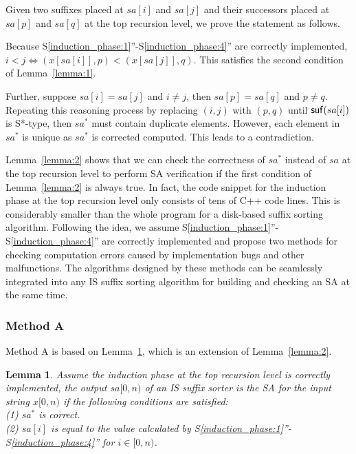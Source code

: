\documentclass[10pt,journal,compsoc]{IEEEtran}
\newtheorem{lemma}[theorem]{Lemma}
\begin{document}
\begin{IEEEproof} Given two suffixes placed at $sa[i]$ and $sa[j]$ and their successors placed at $sa[p]$ and $sa[q]$ at the top recursion level, we prove the statement as follows.

Because S\ref{induction_phase:1}''-S\ref{induction_phase:4}'' are correctly implemented, $i < j \iff (x[sa[i]], p) < (x[sa[j]], q)$. This satisfies the second condition of Lemma~\ref{lemma:1}.

Further, suppose $sa[i] = sa[j]$ and $i \ne j$, then $sa[p] = sa[q]$ and $p \ne q$. Repeating this reasoning process by replacing $(i, j)$ with $(p, q)$ until ${\sf suf}(sa[i])$ is S*-type, then $sa^*$ must contain duplicate elements. However, each element in $sa^*$ is unique as $sa^*$ is corrected computed. This leads to a contradiction.

\end{IEEEproof}

Lemma~\ref{lemma:2} shows that we can check the correctness of $sa^*$ instead of $sa$ at the top recursion level to perform SA verification if the first condition of Lemma~\ref{lemma:2} is always true. In fact, the code snippet for the induction phase at the top recursion level only consists of tens of C++ code lines. This is considerably smaller than the whole program for a disk-based suffix sorting algorithm. Following the idea, we assume S\ref{induction_phase:1}''-S\ref{induction_phase:4}'' are correctly implemented and propose two methods for checking computation errors caused by implementation bugs and other malfunctions. The algorithms designed by these methods can be seamlessly integrated into any IS suffix sorting algorithm for building and checking an SA at the same time.

\subsubsection{Method A} \label{sec:proposals:method_a}

Method A is based on Lemma~\ref{lemma:3}, which is an extension of Lemma~\ref{lemma:2}.

\begin{lemma} \label{lemma:3}
	Assume the induction phase at the top recursion level is correctly implemented, the output $sa[0, n)$ of an IS suffix sorter is the SA for the input string $x[0,  n)$ if the following conditions are satisfied: \\
	(1) $sa^*$ is correct. \\
	(2) $sa[i]$ is equal to the value calculated by S\ref{induction_phase:1}''-S\ref{induction_phase:4}'' for $i \in [0, n)$. \\
	
\end{lemma}
\end{document}

